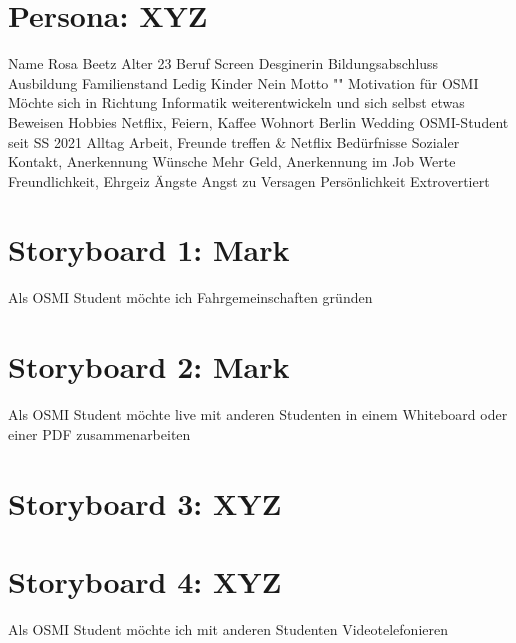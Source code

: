 \documentclass{article}
\begin{document}
\newpage

\section{Persona: XYZ}

Name					Rosa Beetz
Alter					23
Beruf					Screen Desginerin
Bildungsabschluss		Ausbildung
Familienstand			Ledig
Kinder					Nein
Motto					""
Motivation für OSMI		Möchte sich in Richtung Informatik weiterentwickeln und sich selbst etwas Beweisen
Hobbies					Netflix, Feiern, Kaffee
Wohnort					Berlin Wedding
OSMI-Student seit		SS 2021
Alltag					Arbeit, Freunde treffen \& Netflix
Bedürfnisse				Sozialer Kontakt, Anerkennung
Wünsche					Mehr Geld, Anerkennung im Job
Werte					Freundlichkeit, Ehrgeiz
Ängste					Angst zu Versagen
Persönlichkeit			Extrovertiert

\newpage

\section{Storyboard 1: Mark}

Als OSMI Student möchte ich Fahrgemeinschaften gründen

\newpage

\section{Storyboard 2: Mark}

Als OSMI Student möchte live mit anderen Studenten in einem Whiteboard oder einer PDF zusammenarbeiten

\newpage

\section{Storyboard 3: XYZ}

\newpage

\section{Storyboard 4: XYZ}

Als OSMI Student möchte ich mit anderen Studenten Videotelefonieren

\newpage
\end{document}

